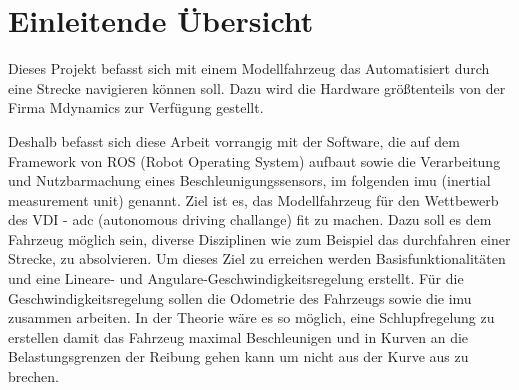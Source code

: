 %
%
%
\section{Einleitende Übersicht%
         \label{sec:Einleitung}}

Dieses Projekt befasst sich mit einem Modellfahrzeug das Automatisiert durch eine Strecke navigieren können soll. Dazu wird die Hardware größtenteils von der Firma Mdynamics zur Verfügung gestellt. 

Deshalb befasst sich diese Arbeit vorrangig mit der Software, die auf dem Framework von ROS (Robot Operating System) aufbaut sowie die Verarbeitung und Nutzbarmachung eines Beschleunigungssensors, im folgenden imu (inertial measurement unit) genannt. 
Ziel ist es, das Modellfahrzeug für den Wettbewerb des VDI - adc (autonomous driving challange) fit zu machen. Dazu soll es dem Fahrzeug möglich sein, diverse Disziplinen wie zum Beispiel das durchfahren einer Strecke, zu absolvieren. 
Um dieses Ziel zu erreichen werden Basisfunktionalitäten und eine Lineare- und Angulare-Geschwindigkeitsregelung erstellt. Für die Geschwindigkeitsregelung sollen die Odometrie des Fahrzeugs sowie die imu zusammen arbeiten. In der Theorie wäre es so möglich, eine Schlupfregelung zu erstellen damit das Fahrzeug maximal Beschleunigen und in Kurven an die Belastungsgrenzen der Reibung gehen kann um nicht aus der Kurve aus zu brechen. 